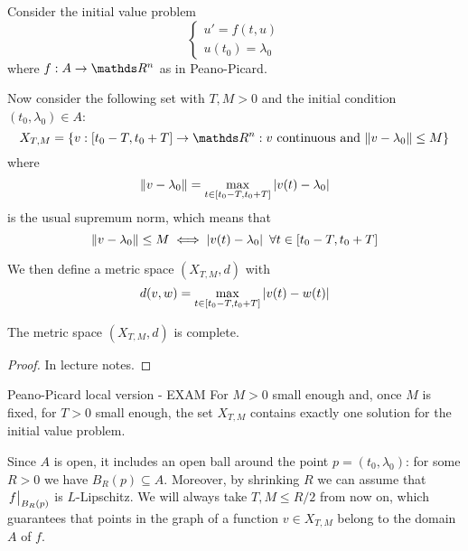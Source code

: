 \documentclass[12pt]{extarticle}
\begin{document}
Consider the initial value problem
\begin{equation}
    \begin{cases}
        u' = f(t, u) \\
        u(t_0) = \lambda_0
    \end{cases}
\end{equation}
where $f: A \to \R^n$ as in Peano-Picard.

Now consider the following set with $T, M > 0$ and the initial condition $(t_0, \lambda_0) \in A$:
\begin{equation}
    X_{T, M} = \{ v: [t_0 - T, t_0 + T] \to \R^n : v \text{ continuous and } \norm{v-\lambda_0} \leq M \}
\end{equation}
where
\begin{equation}
    \norm{v-\lambda_0} = \max_{t \in [t_0 - T, t_0 + T]} \abs{v(t) - \lambda_0}
\end{equation}
is the usual supremum norm, which means that
\begin{equation}
    \norm{v - \lambda_0} \leq M \iff \abs{v(t) - \lambda_0} \enspace \forall t \in [t_0 - T, t_0 + T]
\end{equation}

We then define a metric space $(X_{T, M}, d)$ with
\begin{equation}
    d(v, w) = \max_{t \in [t_0 - T, t_0 + T]} \abs{v(t) - w(t)}
\end{equation}

\begin{proposition}{}{}
    The metric space $(X_{T,M}, d)$ is complete.
\end{proposition}

\begin{proof}
    In lecture notes.
\end{proof}

\begin{theorem}{Peano-Picard local version - EXAM}{}
    For $M > 0$ small enough and, once $M$ is fixed, for $T>0$ small enough, the set $X_{T, M}$ contains exactly one solution
    for the initial value problem.
\end{theorem}

Since $A$ is open, it includes an open ball around the point $p = (t_0, \lambda_0)$:
for some $R > 0$ we have $B_R(p) \subseteq A$.
Moreover, by shrinking $R$ we can assume that $\eval{f}_{B_R(p)}$ is $L$-Lipschitz.
We will always take $T, M \leq R/2$ from now on, which guarantees that points in the graph of a function $v \in X_{T, M}$ belong to the domain $A$ of $f$.
\end{document}
